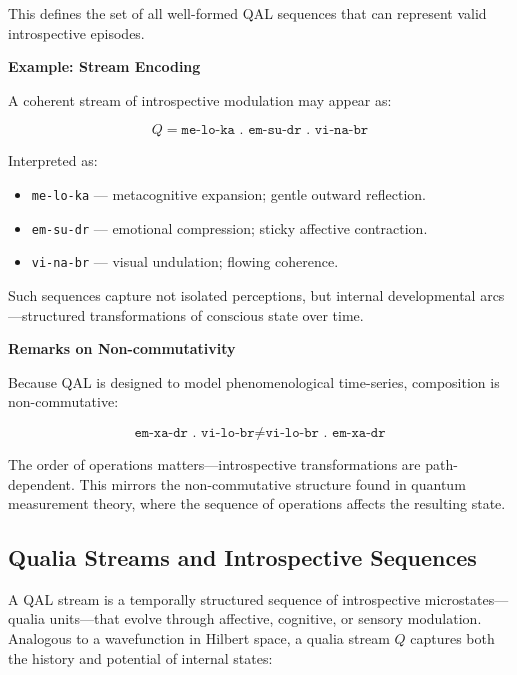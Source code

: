 \documentclass[11pt]{article}
\numberwithin{equation}{section} %
\begin{document}
This defines the set of all well-formed QAL sequences that can represent valid introspective episodes.

\bigskip

\noindent\textbf{Example: Stream Encoding}

A coherent stream of introspective modulation may appear as:

\begin{equation}
Q = \texttt{me-lo-ka . em-su-dr . vi-na-br}
\end{equation}

Interpreted as:
\begin{itemize}
  \item \texttt{me-lo-ka} — metacognitive expansion; gentle outward reflection.
  \item \texttt{em-su-dr} — emotional compression; sticky affective contraction.
  \item \texttt{vi-na-br} — visual undulation; flowing coherence.
\end{itemize}

Such sequences capture not isolated perceptions, but internal developmental arcs—structured transformations of conscious state over time.

\bigskip

\noindent\textbf{Remarks on Non-commutativity}

Because QAL is designed to model phenomenological time-series, composition is non-commutative:

\begin{equation}
\texttt{em-xa-dr . vi-lo-br} \neq \texttt{vi-lo-br . em-xa-dr}
\end{equation}

The order of operations matters—introspective transformations are path-dependent. This mirrors the non-commutative structure found in quantum measurement theory, where the sequence of operations affects the resulting state.

\subsection{Qualia Streams and Introspective Sequences}

A QAL stream is a temporally structured sequence of introspective microstates—qualia units—that evolve through affective, cognitive, or sensory modulation. Analogous to a wavefunction in Hilbert space, a qualia stream \( Q \) captures both the history and potential of internal states:
\end{document}
